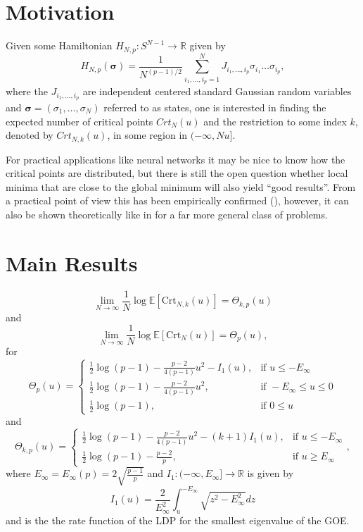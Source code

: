 \section{Motivation}
Given some Hamiltonian $H_{N,p}: S^{N-1}\rightarrow\mathbb R$ given by $$H_{N,p}(\bm\sigma)=\frac{1}{N^{(p-1)/2}}\sum_{i_1,\dots,i_p=1}^N J_{i_1,\dots,i_p}\sigma_{i_1}\dots\sigma_{i_p},$$ where the $J_{i_1,\dots,i_p}$ are independent centered standard Gaussian random variables and $\bm\sigma=(\sigma_1,\dots,\sigma_N)$ referred to as states, one is interested in finding the expected number of critical points $Crt_N(u)$ and the restriction to some index $k$, denoted by $Crt_{N,k}(u)$, in some region in $(-\infty,Nu]$.

For practical applications like neural networks it may be nice to know how the critical points are distributed, but there is still the open question whether local minima that are close to the global minimum will also yield ``good results''. From a practical point of view this has been empirically confirmed (\cite{LeCun2014loss}), however, it can also be shown theoretically like in \cite{loh2013regularized} for a far more general class of problems.

\section{Main Results}
\begin{theorem}
	\begin{equation}\label{thm:2.5}
		\lim_{N\rightarrow\infty}\frac{1}{N}\log\mathbb E[\text{Crt}_{N,k}(u)] = \Theta_{k,p}(u)
	\end{equation}
	and
	\begin{equation}\label{thm:2.8}
		\lim_{N\rightarrow\infty}\frac{1}{N}\log\mathbb E[\text{Crt}_N(u)] = \Theta_p(u),
	\end{equation}
	for $$\Theta_p(u)=\begin{cases}
						\frac{1}{2}\log(p-1)-\frac{p-2}{4(p-1)}u^2-I_1(u), &\mbox{if } u\leq-E_\infty \\
						\frac{1}{2}\log(p-1)-\frac{p-2}{4(p-1)}u^2, &\mbox{if } -E_\infty\leq u\leq 0\\ 
						\frac{1}{2}\log(p-1), &\mbox{if } 0\leq u
					  \end{cases}$$
	and
	$$\Theta_{k,p}(u)=\begin{cases}
						\frac{1}{2}\log(p-1)-\frac{p-2}{4(p-1)}u^2-(k+1)I_1(u), &\mbox{if } u\leq-E_\infty \\
						\frac{1}{2}\log(p-1)-\frac{p-2}{p}, &\mbox{if } u \geq E_\infty
					  \end{cases},$$
	where $E_\infty=E_\infty(p)=2\sqrt{\frac{p-1}{p}}$ and $I_1:(-\infty,E_\infty]\rightarrow\mathbb R$ is given by $$I_1(u)=\frac{2}{E_\infty^2}\int_u^{-E_\infty}\sqrt{z^2-E_\infty^2}dz$$ and is the the rate function of the LDP for the smallest eigenvalue of the GOE.
\end{theorem}

